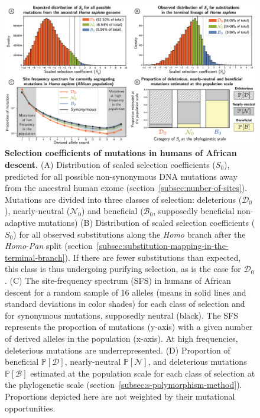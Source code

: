 \documentclass[10pt,letterpaper]{article}
\newcommand{\proba}{\mathbb{P}}
\newcommand{\Sphy}{S_{0}}
\newcommand{\SphyDel}{\mathcal{D}_0}
\newcommand{\SphyNeu}{\mathcal{N}_0}
\newcommand{\SphyBen}{\mathcal{B}_0}
\newcommand{\SpopDel}{\mathcal{D}}
\newcommand{\SpopNeu}{\mathcal{N}}
\newcommand{\SpopBen}{\mathcal{B}}
\newcommand{\ProbaPopDel}{\proba [ \SpopDel]}
\newcommand{\ProbaPopNeu}{\proba [ \SpopNeu ]}
\newcommand{\ProbaPopBen}{\proba [ \SpopBen ]}
\begin{document}
\begin{figure}[!ht]
\begin{adjustwidth}{-2.25in}{0in} %
\centering
\includegraphics[width=1.4\textwidth, page=1] {figure3.eps}
\caption{
{\bf Selection coefficients of mutations in humans of African descent.}
(A) Distribution of scaled selection coefficients ($\Sphy$), predicted for all possible non-synonymous DNA mutations away from the ancestral human exome (section~\ref{subsec:nunber-of-sites}).
Mutations are divided into three classes of selection: deleterious ($\SphyDel$), nearly-neutral ($\SphyNeu$) and beneficial ($\SphyBen$, supposedly beneficial non-adaptive mutations)
(B) Distribution of scaled selection coefficients ($\Sphy$) for all observed substitutions along the \textit{Homo} branch after the \textit{Homo}-\textit{Pan} split (section~\ref{subsec:substitution-mapping-in-the-terminal-branch}).
If there are fewer substitutions than expected, this class is thus undergoing purifying selection, as is the case for $\SphyDel$.
(C) The site-frequency spectrum (SFS) in humans of African descent for a random sample of 16 alleles (means in solid lines and standard deviations in color shades) for each class of selection and for synonymous mutations, supposedly neutral (black). The SFS represents the proportion of mutations (y-axis) with a given number of derived alleles in the population (x-axis).
At high frequencies, deleterious mutations are underrepresented.
(D) Proportion of beneficial $\ProbaPopDel$, nearly-neutral $\ProbaPopNeu$, and deleterious mutations $\ProbaPopBen$ estimated at the population scale for each class of selection at the phylogenetic scale (section~\ref{subsec:s-polymorphism-method}). Proportions depicted here are not weighted by their mutational opportunities.
}
\label{fig:homo-afr-results}
\end{adjustwidth}
\end{figure}
\end{document}
